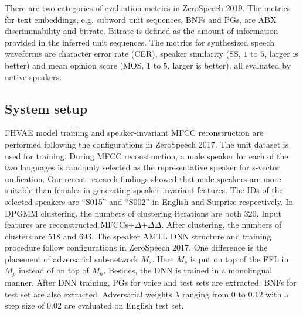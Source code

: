 \documentclass[a4paper]{article}
\begin{document}
There are two categories of evaluation metrics in ZeroSpeech 2019.
The metrics for text embeddings, e.g.  
subword unit sequences, BNFs and PGs, are ABX discriminability and bitrate.  
Bitrate is defined as the amount of information provided in the inferred unit sequences.
The metrics for synthesized speech waveforms are character error rate (CER), speaker similarity (SS, $1$ to $5$, larger is better) and mean opinion score (MOS, $1$ to $5$, larger is better), all evaluated by native speakers.

\subsection{System setup}
FHVAE model training and speaker-invariant MFCC reconstruction are performed following the configurations in ZeroSpeech 2017. The unit dataset is used for training. During MFCC reconstruction, a male speaker for each of the two languages is randomly selected as the representative speaker for s-vector unification. Our recent research findings \cite{Feng2019improving_arxiv} showed that male speakers are more suitable than females in generating speaker-invariant features. The IDs of the selected speakers are  ``S015'' and ``S002'' in English and Surprise respectively.
In DPGMM clustering, the numbers of clustering iterations are both $320$. Input features are reconstructed MFCCs+$\Delta$+$\Delta\Delta$. After clustering, the numbers of clusters are $518$ and $693$. 
The speaker AMTL DNN structure and training procedure follow configurations in ZeroSpeech 2017. One difference is the placement of  adversarial sub-network $M_s$. Here $M_s$ is put on top of the FFL in $M_p$ instead of on top of $M_h$.
Besides, the DNN is trained in a monolingual manner. After DNN training, PGs for voice and test sets are extracted. 
BNFs for test set are also extracted. Adversarial weights $\lambda$ ranging from $0$ to $0.12$ with a step size of $0.02$ are evaluated on English test set.
\end{document}
